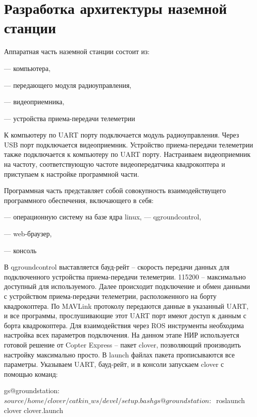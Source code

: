 
\section{Разработка архитектуры наземной станции}
Аппаратная часть наземной станции состоит из:

--- компьютера,

--- передающего модуля радиоуправления,

--- видеоприемника,

--- устройства приема-передачи телеметрии

К компьютеру по UART порту подключается модуль радиоуправления. Через USB порт подключается видеоприемник. Устройство приема-передачи телеметрии также подключается к компьютеру по UART порту. Настраиваем видеоприемник на частоту, соответствующую частоте видеопередатчика квадрокоптера и приступаем к настройке программной части.

Программная часть представляет собой совокупность взаимодействущего программного обеспечения, включающего в себя:

--- операционную систему на базе ядра linux,
--- qgroundcontrol,

--- web-браузер,

--- консоль

В qgroundcontrol выставляется бауд-рейт -- скорость передачи данных для подключенного устройства приема-передачи телеметрии. 115200 -- максимально доступный для используемого. Далее происходит подключение и обмен данными с устройством приема-передачи телеметрии, расположенного на борту квадрокоптера.
По MAVLink протоколу передаются данные в указанный UART, и все программы, прослушивающие этот UART порт имеют доступ к данным с борта квадрокоптера. Для взаимодействия через ROS инструменты необходима настройка всех параметров подключения. На данном этапе НИР используется готовой решение от Copter Express -- пакет clover, позволяющий производить настройку максимально просто. В launch файлах пакета прописываются все параметры. Указываем UART, бауд-рейт, и в консоли запускаем clover с помощью команд:
\begin{MyCode}
gs@groundstation:~$ source /home/clover/catkin\_ws/devel/setup.bash
gs@groundstation:~$ roslaunch clover clover.launch
\end{MyCode}


